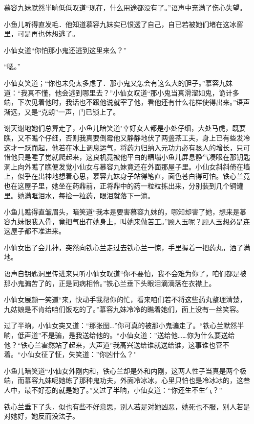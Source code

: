 \documentclass[12pt,oneside]{book}
\begin{document}
慕容九妹默然半晌低低叹道``现在，什么用途都没有了。''语声中充满了伤心失望。

小鱼儿听得直发毛．他知道慕容九妹实已恨透了自己，自已若被她们堵在这冰窖里，可是再也休想逃了。

小仙女道``你怕那小鬼还逃到这里来么？''

``嗯。''

小仙女笑道；``你也未免太多虑了．那小鬼又怎会有这么大的胆子。''慕容九妹道：``我真不懂，他会逃到哪里去？''小仙女叹道``那小鬼当真滑溜如鬼，诡计多端，下次见着他时，我话也不跟他说就宰了他，看他还有什么花样使得出来。''语声渐远，又是``克朗''一声，门已锁上了。

谢天谢地她们总算走了，小鱼儿暗笑道"幸好女人都是小处仔细，大处马虎，既要瞧，又不瞧个仔细，否则我真要倒霉他又静静地伏了两盏茶工夫，身上已有些发冷这才一跃而起，他若在冰上调息运气，将药力归纳入元功力必有骇人的增长，只可惜他只是睡了觉就爬起来，这良机竟被他平白的糟塌小鱼儿屏息静气凑眼在那钥匙洞上向外瞧了瞧便发觉小仙女与慕容九妹竟还在外面那屋子里。小仙女斜斜倚在墙上，似乎在出神地想着心思，慕容九妹身子站得笔直，面色苍白得可怕。铁心兰竟也在这屋子里，她坐在药鼎前，正将鼎中的药一粒粒拣出来，分别装到几个铜罐里。她满眶泪水，每捡一粒药，眼泪就落下一滴。

小鱼儿瞧得直皱眉头，暗笑道``我本是要害慕容九妹的，哪知却害了她，想来是慕容九妹恨我入骨，竟把气出在她身上，叫她来做苦工。''顾人玉呢？顾人玉想必是连这屋子都不准进来。

小仙女出了会儿神，突然向铁心兰走过去铁心兰一惊，手里握着一把药丸，洒了满地。

语声自钥匙洞里传进来只听小仙女叹道``你不要怕，我不会难为你了，咱们都是被那小鬼骗苦了的，正是同病相怜。''铁心兰垂下头眼泪滴滴落在衣襟上。

小仙女展颜一笑道``来，快动手我帮你的忙，看来咱们若不将这些药丸整理清楚，九姑娘是不肯给咱们饭吃的了。''慕容九妹冷冷的瞧着她们，面上没有一丝笑容。

过了半晌，小仙女突又道：``那张图\ldots{}''你可真的被那小鬼骗走了。``铁心兰默然半晌，低声道''不是骗，是我送给他的。``小仙女道：''送给他\ldots\ldots 你为什么要送给他？``铁心兰霍然站了起来，大声道''我高兴送给谁就送给谁，这事谁也管不着。``小仙女征了怔，失笑道：''你凶什么？"

小鱼儿暗笑道``小仙女外刚内和，铁心兰却是外和内刚，这两人性子当真是两个极端，而慕容九妹呢她练了那种鬼功夫，外面冷冰冰，心里只怕也是冷冰冰的，这叁人中，最不好惹的就是她了。''又过了半晌，小仙女道：``你还生不生气？''

铁心兰垂下了头．似也有些不好意思，别人若是对她凶恶，她死也不服，别人若是对她好，她反而没法子。
\end{document}
